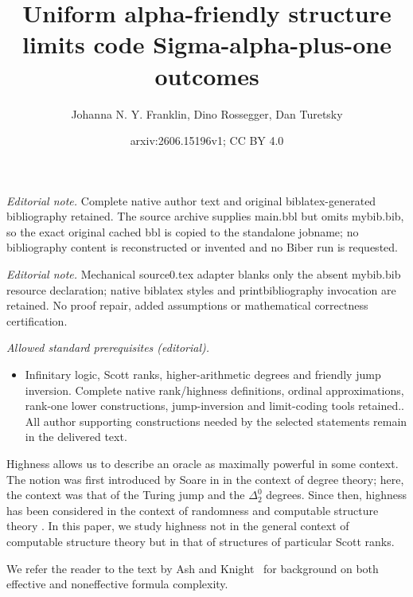 \documentclass[10pt,a4paper]{amsart}
\title{Uniform alpha-friendly structure limits code Sigma-alpha-plus-one outcomes}
\author{Johanna N. Y. Franklin, Dino Rossegger, Dan Turetsky}
\date{arxiv:2606.15196v1; CC BY 4.0}
\newcommand\+[1]{\mathcal{#1}}
\renewcommand\*[1]{\mathbf{#1}}
\renewcommand\=[1]{\text{#1}}
\renewcommand\*[1]{\mathbf{#1}}
\begin{document}
\maketitle
\noindent\textit{Editorial note.} Complete native author text and original biblatex-generated bibliography retained. The source archive supplies main.bbl but omits mybib.bib, so the exact original cached bbl is copied to the standalone jobname; no bibliography content is reconstructed or invented and no Biber run is requested.\par\medskip
\noindent\textit{Editorial note.} Mechanical source0.tex adapter blanks only the absent mybib.bib resource declaration; native biblatex styles and printbibliography invocation are retained. No proof repair, added assumptions or mathematical correctness certification.\par\medskip
\noindent\textit{Allowed standard prerequisites (editorial).}\begin{itemize}
\item Infinitary logic, Scott ranks, higher-arithmetic degrees and friendly jump inversion. Complete native rank/highness definitions, ordinal approximations, rank-one lower constructions, jump-inversion and limit-coding tools retained.. All author supporting constructions needed by the selected statements remain in the delivered text.
\end{itemize}\medskip
Highness allows us to describe an oracle as maximally powerful in some context. The notion was first introduced by Soare in \cite{s72} in the context of degree theory; here, the context was that of the Turing jump and the $\Delta^0_2$ degrees. Since then, highness has been considered in the context of randomness \cite{fsy-bases} and computable structure theory \cite{cft23,cft}. In this paper, we study highness not in the general context of computable structure theory but in that of structures of particular Scott ranks.

We refer the reader to the text by Ash and Knight~\cite{ash2000} for background on both effective and noneffective formula complexity.
\end{document}
